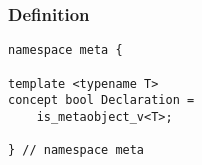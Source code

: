 
\subsubsection{Definition}

\begin{verbatim}
namespace meta {

template <typename T>
concept bool Declaration =
	is_metaobject_v<T>;

} // namespace meta
\end{verbatim}
